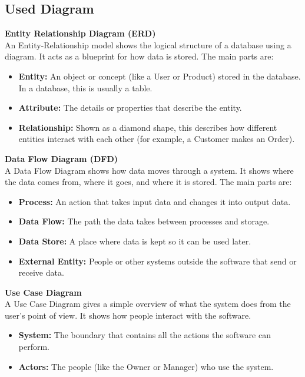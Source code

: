 \documentclass[12pt,a4paper]{report}
\begin{document}
\subsection{Used Diagram}

\textbf{Entity Relationship Diagram (ERD)}\\
An Entity-Relationship model shows the logical structure of a database using a diagram. It acts as a blueprint for how data is stored. The main parts are:
\begin{itemize}
    \item \textbf{Entity:} An object or concept (like a User or Product) stored in the database. In a database, this is usually a table.
    \item \textbf{Attribute:} The details or properties that describe the entity.
    \item \textbf{Relationship:} Shown as a diamond shape, this describes how different entities interact with each other (for example, a Customer makes an Order).
\end{itemize}

\textbf{Data Flow Diagram (DFD)}\\
A Data Flow Diagram shows how data moves through a system. It shows where the data comes from, where it goes, and where it is stored. The main parts are:
\begin{itemize}
    \item \textbf{Process:} An action that takes input data and changes it into output data.
    \item \textbf{Data Flow:} The path the data takes between processes and storage.
    \item \textbf{Data Store:} A place where data is kept so it can be used later.
    \item \textbf{External Entity:} People or other systems outside the software that send or receive data.
\end{itemize}

\textbf{Use Case Diagram}\\
A Use Case Diagram gives a simple overview of what the system does from the user's point of view. It shows how people interact with the software.
\begin{itemize}
    \item \textbf{System:} The boundary that contains all the actions the software can perform.
    \item \textbf{Actors:} The people (like the Owner or Manager) who use the system.
\end{itemize}
\end{document}
